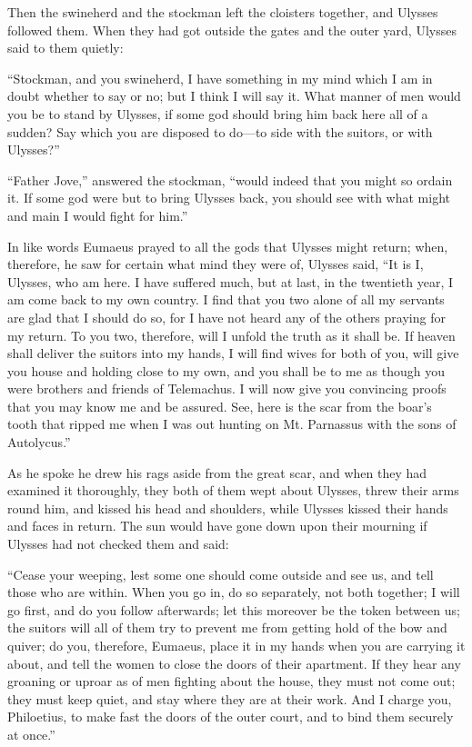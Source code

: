Then the swineherd and the stockman left the cloisters together, and Ulysses
followed them. When they had got outside the gates and the outer yard, Ulysses
said to them quietly:

“Stockman, and you swineherd, I have something in my mind which I am in doubt
whether to say or no; but I think I will say it. What manner of men would you
be to stand by Ulysses, if some god should bring him back here all of a sudden?
Say which you are disposed to do—to side with the suitors, or with Ulysses?”

“Father Jove,” answered the stockman, “would indeed that you might so ordain
it. If some god were but to bring Ulysses back, you should see with what might
and main I would fight for him.”

In like words Eumaeus prayed to all the gods that Ulysses might return; when,
therefore, he saw for certain what mind they were of, Ulysses said, “It is I,
Ulysses, who am here. I have suffered much, but at last, in the twentieth year,
I am come back to my own country. I find that you two alone of all my servants
are glad that I should do so, for I have not heard any of the others praying
for my return. To you two, therefore, will I unfold the truth as it shall be.
If heaven shall deliver the suitors into my hands, I will find wives for both
of you, will give you house and holding close to my own, and you shall be to me
as though you were brothers and friends of Telemachus. I will now give you
convincing proofs that you may know me and be assured. See, here is the scar
from the boar’s tooth that ripped me when I was out hunting on Mt. Parnassus
with the sons of Autolycus.”

As he spoke he drew his rags aside from the great scar, and when they had
examined it thoroughly, they both of them wept about Ulysses, threw their arms
round him, and kissed his head and shoulders, while Ulysses kissed their hands
and faces in return. The sun would have gone down upon their mourning if
Ulysses had not checked them and said:

“Cease your weeping, lest some one should come outside and see us, and tell
those who are within. When you go in, do so separately, not both together; I
will go first, and do you follow afterwards; let this moreover be the token
between us; the suitors will all of them try to prevent me from getting hold of
the bow and quiver; do you, therefore, Eumaeus, place it in my hands when you
are carrying it about, and tell the women to close the doors of their
apartment. If they hear any groaning or uproar as of men fighting about the
house, they must not come out; they must keep quiet, and stay where they are at
their work. And I charge you, Philoetius, to make fast the doors of the outer
court, and to bind them securely at once.”

